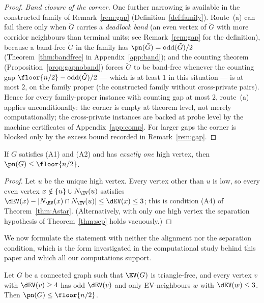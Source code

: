 \begin{proof}
\emph{Band closure of the corner.} One further narrowing is available in the constructed
family of Remark~\ref{rem:gap} (Definition~\ref{def:family}). Route~(a) can fail there only when $\tilde G$ carries a
\emph{deadlock band} (an even vertex of $\tilde G$ with more corridor neighbours than
terminal units; see Remark~\ref{rem:gap} for the definition), because a band-free $\tilde G$
in the family has $\pn(\tilde G)=\mathrm{odd}(\tilde G)/2$
(Theorem~\ref{thm:bandfree} in Appendix~\ref{app:band}); and the counting theorem
(Proposition~\ref{prop:gapnoband}) forces $\tilde G$ to be band-free whenever the counting gap
$\floor{n/2}-\mathrm{odd}(\tilde G)/2$ --- which is at least $1$ in this situation --- is at
most $2$, on the family proper (the constructed family without cross-private pairs).
Hence for every family-proper instance with counting gap at most $2$,
route~(a) applies unconditionally: the corner is empty at theorem level, not merely
computationally; the cross-private instances are backed at probe level by the machine
certificates of Appendix~\ref{app:comp}. For larger gaps the corner is blocked only by the excess bound recorded in
Remark~\ref{rem:gap}.
\end{proof}

\begin{corollary}\label{cor:uniquehigh}
If $G$ satisfies (A1) and (A2) and has \emph{exactly one} high vertex, then
$\pn(G)\le\floor{n/2}$.
\end{corollary}

\begin{proof}
Let $u$ be the unique high vertex. Every vertex other than $u$ is low, so every even vertex
$x\notin\{u\}\cup N_{\EV}(u)$ satisfies
$\dEV(x)-|N_{\EV}(x)\cap N_{\EV}(u)|\le\dEV(x)\le 3$; this is condition (A4) of
Theorem~\ref{thm:Astar}. (Alternatively, with only one high vertex the separation hypothesis of
Theorem~\ref{thm:sep} holds vacuously.)
\end{proof}

We now formulate the statement with neither the alignment nor the separation condition, which is
the form investigated in the computational study behind this paper and which all our computations
support.

\begin{conjecture}\label{conj:Astar}
Let $G$ be a connected graph such that $\EV(G)$ is triangle-free, and every vertex $v$ with
$\dEV(v)\ge 4$ has odd $\dEV(v)$ and only EV-neighbours $w$ with $\dEV(w)\le 3$. Then
$\pn(G)\le\floor{n/2}$.
\end{conjecture}

